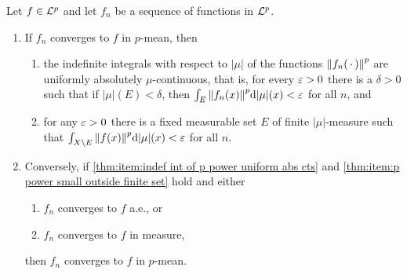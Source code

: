 \begin{theorem}
Let $f\in{\cal L}^p$ and let $f_n$ be a sequence of functions in ${\cal L}^p$.
\begin{enumerate}[label=\Roman*),ref=\Roman*)]
    \item \label{thm:cond:converge p mean}
    If $f_n$ converges to $f$ in $p$-mean, then
    \begin{enumerate}[label=\arabic*),ref=\arabic*)]
        \item \label{thm:item:indef int of p power uniform abs cts}
        the indefinite integrals with respect to $|\mu|$ of the functions $\norm{f_n(\,\cdot\,)}^p$ are uniformly absolutely $\mu$-continuous, that is, for every $\varepsilon>0$ there is a $\delta>0$ such that if $|\mu|(E)<\delta$, then $\int_E\norm{f_n(x)}^p\dd|\mu|(x)<\varepsilon$ for all $n$, and
        
        \item \label{thm:item:p power small outside finite set}
        for any $\varepsilon>0$ there is a fixed measurable set $E$ of finite $|\mu|$-measure such that $\int_{X\setminus E}\norm{f(x)}^p\dd|\mu|(x)<\varepsilon$ for all $n$.
    \end{enumerate}
    
    \item \label{thm:cond:converge p mean converse}
    Conversely, if \ref{thm:item:indef int of p power uniform abs cts} and \ref{thm:item:p power small outside finite set} hold and either
    \begin{enumerate}[label=3\alph*),ref=3\alph*)]
        \item \label{thm:item:vitali thm}
        $f_n$ converges to $f$ a.e., or
        \item \label{thm:item:Lp convergence thm}
        $f_n$ converges to $f$ in measure, 
    \end{enumerate}
    then $f_n$ converges to $f$ in $p$-mean.
\end{enumerate}
\end{theorem}

